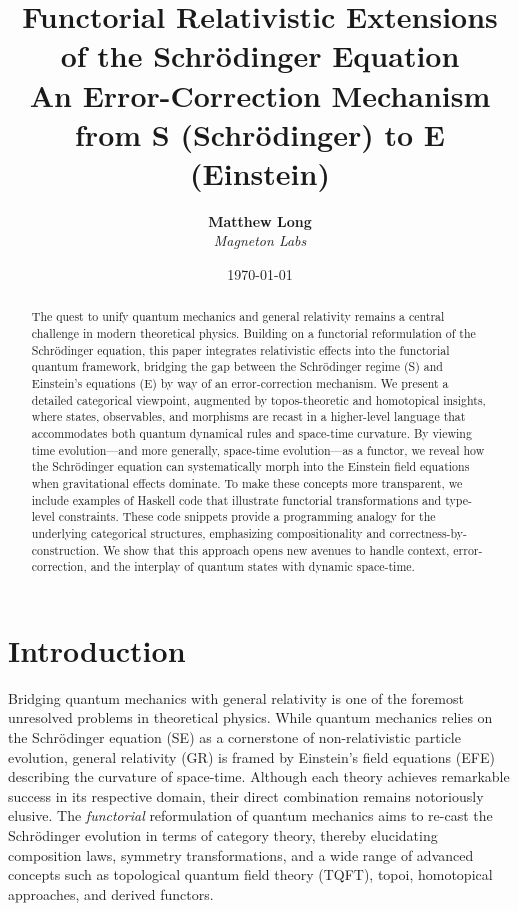 \documentclass[12pt]{article}
\title{\textbf{Functorial Relativistic Extensions of the Schr\"odinger Equation}\\
       \textbf{An Error-Correction Mechanism from S (Schr\"odinger) to E (Einstein)}}
\author{
  \textbf{Matthew Long} \\
  \emph{Magneton Labs}
}
\date{\today}
\begin{document}
\maketitle

\begin{abstract}
The quest to unify quantum mechanics and general relativity remains a central challenge in modern theoretical physics. Building on a functorial reformulation of the Schr\"odinger equation, this paper integrates relativistic effects into the functorial quantum framework, bridging the gap between the Schr\"odinger regime (S) and Einstein's equations (E) by way of an error-correction mechanism. We present a detailed categorical viewpoint, augmented by topos-theoretic and homotopical insights, where states, observables, and morphisms are recast in a higher-level language that accommodates both quantum dynamical rules and space-time curvature. By viewing time evolution---and more generally, space-time evolution---as a functor, we reveal how the Schr\"odinger equation can systematically morph into the Einstein field equations when gravitational effects dominate. To make these concepts more transparent, we include examples of Haskell code that illustrate functorial transformations and type-level constraints. These code snippets provide a programming analogy for the underlying categorical structures, emphasizing compositionality and correctness-by-construction. We show that this approach opens new avenues to handle context, error-correction, and the interplay of quantum states with dynamic space-time.
\end{abstract}

\tableofcontents

\section{Introduction}
Bridging quantum mechanics with general relativity is one of the foremost unresolved problems in theoretical physics. While quantum mechanics relies on the Schr\"odinger equation (SE) as a cornerstone of non-relativistic particle evolution, general relativity (GR) is framed by Einstein's field equations (EFE) describing the curvature of space-time. Although each theory achieves remarkable success in its respective domain, their direct combination remains notoriously elusive. The \emph{functorial} reformulation of quantum mechanics aims to re-cast the Schr\"odinger evolution in terms of category theory, thereby elucidating composition laws, symmetry transformations, and a wide range of advanced concepts such as topological quantum field theory (TQFT), topoi, homotopical approaches, and derived functors.
\end{document}
